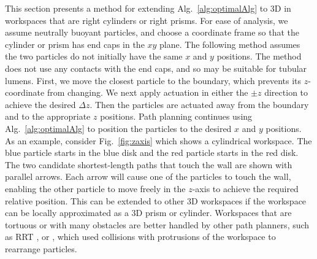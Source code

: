 This section presents a method for extending Alg.~\ref{alg:optimalAlg} to 3D in workspaces that are right cylinders or right prisms.
For ease of analysis, we assume neutrally buoyant particles, and choose a coordinate frame so that the cylinder or prism has end caps in the $xy$ plane.
 The following method assumes the two particles do not initially have the same $x$ and $y$ positions.
 The method does not use any contacts with the end caps, and so may be suitable for tubular lumens. 
 First, we move the closest particle to the boundary, which prevents its $z$-coordinate from changing.  
 We next apply actuation in either the $\pm z$ direction to achieve the desired $\Delta z$.
 Then the particles are actuated away from the boundary and to the appropriate $z$ positions.
 Path planning continues using Alg.~\ref{alg:optimalAlg} to position the particles to the desired $x$ and $y$ positions. 
 As an example, consider Fig.~\ref{fig:zaxis} which shows a cylindrical workspace.
 The blue particle starts in the blue disk and the red particle starts in the red disk. 
 The two candidate shortest-length paths that touch the wall are shown with parallel arrows. 
Each arrow will cause one of the particles to touch the wall, enabling the other particle to move freely in the  $z$-axis to achieve the required relative position.
This can be extended to other 3D workspaces if the workspace can be locally approximated as a 3D prism or cylinder.  Workspaces that are tortuous or with many obstacles are better handled by other path planners, such as RRT \cite{lavalle1998rapidly}, or \cite{AaronManipulation2013}, which used  collisions with  protrusions of the workspace to rearrange particles.








